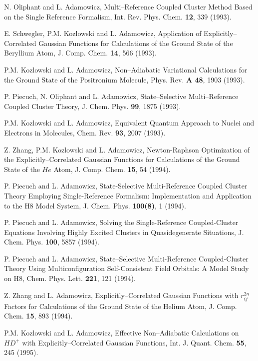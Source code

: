 \begin{thebibliography}{999}


N. Oliphant and L. Adamowicz, Multi--Reference Coupled Cluster 
Method Based on the Single
Reference Formalism, Int. Rev. Phys. Chem. {\bf 12}, 339 (1993).

E. Schwegler, P.M. Kozlowski and L. Adamowicz, 
Application of Explicitly--Correlated Gaussian
Functions for Calculations of the 
Ground State of the Beryllium Atom, J. Comp. Chem. {\bf 14}, 566 (1993).

P.M. Kozlowski and L. Adamowicz, Non--Adiabatic 
Variational Calculations for the Ground State of
the Positronium Molecule, Phys. Rev. {\bf A 48}, 1903 (1993).

   P. Piecuch, N. Oliphant and L. Adamowicz, 
State--Selective Multi--Reference Coupled Cluster Theory,
J. Chem. Phys. {\bf 99}, 1875 (1993).


P.M. Kozlowski and L. Adamowicz, Equivalent 
Quantum Approach to Nuclei and Electrons in
Molecules, Chem. Rev. {\bf 93}, 2007 (1993).


Z. Zhang, P.M. Kozlowski and L. Adamowicz, Newton-Raphson 
Optimization of the Explicitly--Correlated 
Gaussian Functions for Calculations of 
the Ground State of the $He$ Atom, J. Comp. Chem.
{\bf 15}, 54 (1994).



P. Piecuch and L. Adamowicz, State-Selective Multi-Reference 
Coupled Cluster Theory Employing
Single-Reference Formalism:  Implementation and Application 
to the H8 Model System, J. Chem. Phys.
{\bf 100(8)}, 1 (1994).

P. Piecuch and L. Adamowicz, Solving the Single-Reference 
Coupled-Cluster Equations Involving
Highly Excited Clusters in Quasidegenerate Situations, 
J. Chem. Phys. {\bf 100}, 5857 (1994).

P. Piecuch and L. Adamowicz, State--Selective 
Multi-Reference Coupled-Cluster Theory Using
Multiconfiguration Self-Consistent Field Orbitals:  A 
Model Study on H8, Chem. Phys. Lett. {\bf 221}, 121
(1994).

  Z. Zhang and L. Adamowicz, Explicitly--Correlated 
Gaussian Functions with $r_{ij}^{2n}$ Factors for Calculations
of the Ground State of the Helium Atom, J. Comp. Chem. 
{\bf 15}, 893 (1994).

  P.M. Kozlowski and L. Adamowicz, Effective 
Non--Adiabatic Calculations on $HD^{+}$ with 
Explicitly--Correlated Gaussian Functions, 
Int. J. Quant. Chem. {\bf 55}, 245 (1995).


\end{thebibliography}
